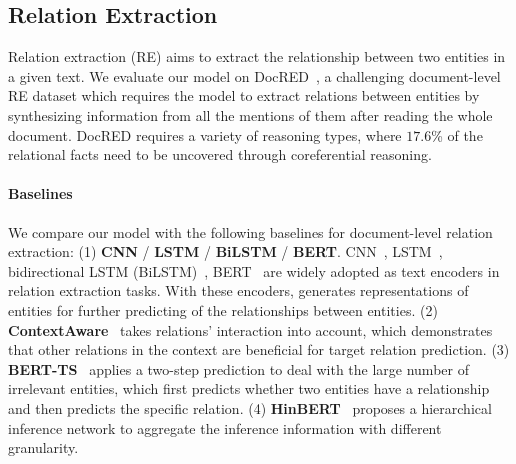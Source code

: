 \documentclass[11pt,a4paper]{article}
\begin{document}
\subsection{Relation Extraction}

Relation extraction (RE) aims to extract the relationship between two entities in a given text. We evaluate our model on DocRED~\citep{DocRED}, a challenging document-level RE dataset which requires the model to extract relations between entities by synthesizing information from all the mentions of them after reading the whole document. DocRED requires a variety of reasoning types, where $17.6$\% of the relational facts need to be uncovered through coreferential reasoning. 



\vspace{-0.1em}
\paragraph{Baselines} We compare our model with the following baselines for document-level relation extraction: (1) \textbf{CNN} / \textbf{LSTM} / \textbf{BiLSTM} / \textbf{BERT}. CNN~\citep{CNNRE}, LSTM~\citep{LSTM}, bidirectional LSTM (BiLSTM)~\citep{BiLSTM}, BERT~\citep{BERT} are widely adopted as text encoders in relation extraction tasks. With these encoders, \citet{DocRED} generates representations of entities for further predicting of the relationships between entities.
(2) \textbf{ContextAware}~\citep{ContextAware} takes relations' interaction into account, which demonstrates that other relations in the context are beneficial for target relation prediction. (3) \textbf{BERT-TS}~\citep{DocREDBert} applies a two-step prediction to deal with the large number of irrelevant entities, which first predicts whether two entities have a relationship and then predicts the specific relation.
(4) \textbf{HinBERT}~\citep{HinBERT} proposes a hierarchical inference network to  aggregate the inference information with different granularity. 
 
\end{document}
